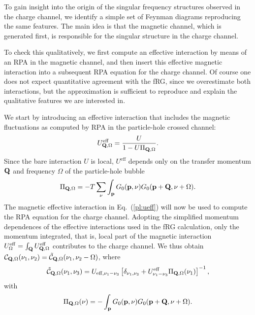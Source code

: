 To gain insight into the origin of the singular frequency structures observed in the charge channel, we identify a simple set of Feynman diagrams reproducing the same features.   
The main idea is that the magnetic channel, which is generated first, is responsible for the singular structure in the charge channel. 

To check this qualitatively, we first compute an effective interaction by means of an RPA in the magnetic channel, and then insert this effective magnetic interaction into a subsequent RPA equation for the charge channel. 
Of course one does not expect quantitative agreement with the fRG, since we overestimate both interactions, but the approximation is sufficient to reproduce and explain the qualitative features we are interested in.  
  
We start by introducing an effective interaction that includes the magnetic fluctuations as computed by RPA in the particle-hole crossed channel:
\begin{equation}
 U^{\mathrm{eff}}_{\mathbf{Q},\Omega} = \frac{U}{1 - U \Pi_{\mathbf{Q},\Omega}}.
\label{pl:ueff}
\end{equation}
Since the bare interaction $U$ is local, $U^{\mathrm{eff}}$ depends only on the transfer momentum $\mathbf{Q}$ and frequency $\Omega$ of the particle-hole bubble
\begin{equation}
 \Pi_{\mathbf{Q},\Omega} =
 - T \sum_{\nu} \int_{\mathbf{p}} G_0(\mathbf{p},\nu) G_0(\mathbf{p}+\mathbf{Q},\nu+\Omega).
\end{equation}
The magnetic effective interaction in Eq.~(\ref{pl:ueff}) will now be used to compute the RPA equation for the charge channel. Adopting the simplified momentum dependences of the effective interactions used in the fRG calculation, only the momentum integrated, that is, local part of the magnetic interaction
$U^{\mathrm{eff}}_{\Omega} = \int_{\mathbf{Q}} U^{\mathrm{eff}}_{\mathbf{Q},\Omega}$
contributes to the charge channel. We thus obtain
$\mathcal{C}_{\mathbf{Q},\Omega} (\nu_1,\nu_2) =
 \mathcal{\tilde C}_{\mathbf{Q},\Omega} (\nu_1,\nu_2 - \Omega)$, where
\begin{equation}
 \mathcal{\tilde C}_{\mathbf{Q},\Omega} (\nu_1,\nu_3) =
 U_{\mathrm{eff},\nu_1-\nu_3} \left[ \delta_{\nu_1,\nu_3} + U^{\mathrm{eff}}_{\nu_1-\nu_3}
 \Pi_{\mathbf{Q},\Omega}(\nu_1) \right]^{-1} ,
 \label{pl:charge}
\end{equation}
with
\begin{equation}
 \Pi_{\mathbf{Q},\Omega}(\nu) =
 - \int_{\mathbf{p}} G_0(\mathbf{p},\nu) G_0(\mathbf{p}+\mathbf{Q},\nu+\Omega) .
\end{equation}
